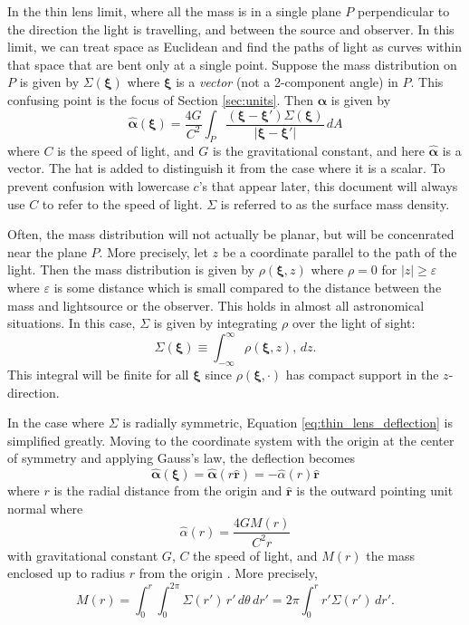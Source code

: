 \documentclass[10pt,twoside]{article}
\theoremstyle{definition}
\theoremstyle{exercise}
\newcommand{\n}[1]{\left| #1 \right|}%
\renewcommand{\v}[1]{\boldsymbol{#1}}%
\begin{document}
In the thin lens limit, where all the mass is in a single plane $P$ perpendicular to the direction the light is travelling, and between the source and observer. In this limit, we can treat space as Euclidean and find the paths of light as curves within that space that are bent only at a single point. Suppose the mass distribution on $P$ is given by $\Sigma(\v{\xi})$ where $\v{\xi}$ is a \emph{vector} (not a 2-component angle) in $P$. This confusing point is the focus of Section \ref{sec:units}. Then $\v{\alpha}$ is given by \cite{Narayan:1996ba}
\begin{equation}
		\hat{\v{\alpha}}(\v{\xi}) = \frac{4G}{C^2} \int_P \frac{\left( \v{\xi} - \v{\xi}' \right)\Sigma(\v{\xi})}{\n{\v{\xi} - \v{\xi}'}} \, dA
		\label{eq:thin_lens_deflection}
\end{equation}
where $C$ is the speed of light, and $G$ is the gravitational constant, and here $\hat{\v{\alpha}}$ is a vector. The hat is added to distinguish it from the case where it is a scalar. To prevent confusion with lowercase $c$'s that appear later, this document will always use $C$ to refer to the speed of light. $\Sigma$ is referred to as the surface mass density.


Often, the mass distribution will not actually be planar, but will be concenrated near the plane $P$. More precisely, let $z$ be a coordinate parallel to the path of the light. Then the mass distribution is given by $\rho(\v{\xi}, z)$ where $\rho = 0$ for $\n{z} \ge \varepsilon$ where $\varepsilon$ is some distance which is small compared to the distance between the mass and lightsource or the observer. This holds in almost all astronomical situations. In this case, $\Sigma$ is given by integrating $\rho$ over the light of sight:
\begin{equation}
		\Sigma(\v{\xi}) \equiv \int_{-\infty}^\infty \rho(\v{\xi}, z), \, dz.
		\label{eq:LOS_approx}
\end{equation}
This integral will be finite for all $\v{\xi}$ since $\rho(\v{\xi}, \cdot)$ has compact support in the $z$-direction.

In the case where $\Sigma$ is radially symmetric, Equation \eqref{eq:thin_lens_deflection} is simplified greatly. Moving to the coordinate system with the origin at the center of symmetry and applying Gauss's law, the deflection becomes
\begin{equation}
		\hat{\v{\alpha}}(\v{\xi}) =	\hat{\v{\alpha}}(r \hat{\v{r}}) = -\hat{\alpha}(r) \hat{\v{r}}
		\label{eq:radially_symmetric}
\end{equation}
where $r$ is the radial distance from the origin and $\hat{\v{r}}$ is the outward pointing unit normal where
\begin{equation}
		\hat{\alpha}(r) = \frac{4G M(r)}{C^2 r}
		\label{eq:radial_deflection}
\end{equation}
with gravitational constant $G$, $C$ the speed of light, and $M(r)$ the mass enclosed up to radius $r$ from the origin \cite{Narayan:1996ba}. More precisely,
\begin{equation}
		M(r) = \int_0^r \int_0^{2\pi} \Sigma(r') \, r' \, d\theta \, dr' = 2\pi \int_0^r r' \Sigma(r') \, dr'.
		\label{eq:mass_enclosed}
\end{equation}
\end{document}
